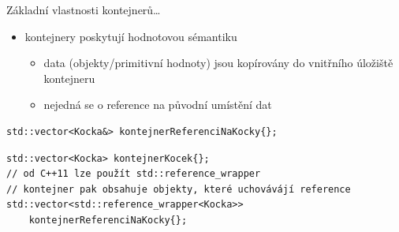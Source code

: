 \begin{frame}[fragile]
\begin{block}{Základní vlastnosti kontejnerů\ldots}
\begin{itemize}
\item kontejnery poskytují hodnotovou sémantiku
\begin{itemize}
\item data (objekty/primitivní hodnoty) jsou kopírovány do vnitřního úložiště kontejneru
\item nejedná se o reference na původní umístění dat
\end{itemize}
\end{itemize}
\end{block}


\begin{noblock}
\begin{lstlisting}
std::vector<Kocka&> kontejnerReferenciNaKocky{};
\end{lstlisting}
\end{noblock}

\begin{yesblock}
\begin{lstlisting}
std::vector<Kocka> kontejnerKocek{};
// od C++11 lze použít std::reference_wrapper
// kontejner pak obsahuje objekty, které uchovávájí reference 
std::vector<std::reference_wrapper<Kocka>> 
	kontejnerReferenciNaKocky{};
\end{lstlisting}
\end{yesblock}
\end{frame}




